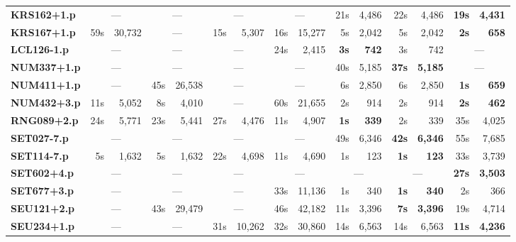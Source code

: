 \documentclass[11pt,twocolumn]{article}
\newcommand{\winner}[1]{{\bfseries\color{ForestGreen}#1}}
\begin{document}
\begin{table}[t]
\begin{tabular}{>{\ttfamily\bfseries}l *{7}{rr}}
			KRS162+1.p & \multicolumn{2}{c}{---} & \multicolumn{2}{c}{---} & \multicolumn{2}{c}{---} & \multicolumn{2}{c}{---} & 21s & 4,486 & 22s & 4,486 & \winner{19s} & \winner{4,431} \\
			KRS167+1.p & 59s & 30,732 & \multicolumn{2}{c}{---} & 15s & 5,307 & 16s & 15,277 & 5s & 2,042 & 5s & 2,042 & \winner{2s} & \winner{658} \\
			\addlinespace
			LCL126-1.p & \multicolumn{2}{c}{---} & \multicolumn{2}{c}{---} & \multicolumn{2}{c}{---} & 24s & 2,415 & \winner{3s} & \winner{742} & 3s & 742 & \multicolumn{2}{c}{---} \\
			\addlinespace
			NUM337+1.p & \multicolumn{2}{c}{---} & \multicolumn{2}{c}{---} & \multicolumn{2}{c}{---} & \multicolumn{2}{c}{---} & 40s & 5,185 & \winner{37s} & \winner{5,185} & \multicolumn{2}{c}{---} \\
			NUM411+1.p & \multicolumn{2}{c}{---} & 45s & 26,538 & \multicolumn{2}{c}{---} & \multicolumn{2}{c}{---} & 6s & 2,850 & 6s & 2,850 & \winner{1s} & \winner{659} \\
			NUM432+3.p & 11s & 5,052 & 8s & 4,010 & \multicolumn{2}{c}{---} & 60s & 21,655 & 2s & 914 & 2s & 914 & \winner{2s} & \winner{462} \\
			\addlinespace
			RNG089+2.p & 24s & 5,771 & 23s & 5,441 & 27s & 4,476 & 11s & 4,907 & \winner{1s} & \winner{339} & 2s & 339 & 35s & 4,025 \\
			\addlinespace
			SET027-7.p & \multicolumn{2}{c}{---} & \multicolumn{2}{c}{---} & \multicolumn{2}{c}{---} & \multicolumn{2}{c}{---} & 49s & 6,346 & \winner{42s} & \winner{6,346} & 55s & 7,685 \\
			SET114-7.p & 5s & 1,632 & 5s & 1,632 & 22s & 4,698 & 11s & 4,690 & 1s & 123 & \winner{1s} & \winner{123} & 33s & 3,739 \\
			SET602+4.p & \multicolumn{2}{c}{---} & \multicolumn{2}{c}{---} & \multicolumn{2}{c}{---} & \multicolumn{2}{c}{---} & \multicolumn{2}{c}{---} & \multicolumn{2}{c}{---} & \winner{27s} & \winner{3,503} \\
			SET677+3.p & \multicolumn{2}{c}{---} & \multicolumn{2}{c}{---} & \multicolumn{2}{c}{---} & 33s & 11,136 & 1s & 340 & \winner{1s} & \winner{340} & 2s & 366 \\
			\addlinespace
			SEU121+2.p & \multicolumn{2}{c}{---} & 43s & 29,479 & \multicolumn{2}{c}{---} & 46s & 42,182 & 11s & 3,396 & \winner{7s} & \winner{3,396} & 19s & 4,714 \\
			SEU234+1.p & \multicolumn{2}{c}{---} & \multicolumn{2}{c}{---} & 31s & 10,262 & 32s & 30,860 & 14s & 6,563 & 14s & 6,563 & \winner{11s} & \winner{4,236} \\

\end{tabular}
\end{table}
\end{document}
